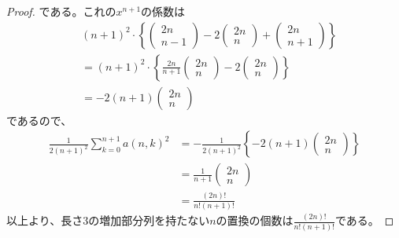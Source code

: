 \documentclass[a4paper,11pt]{jsarticle}
\theoremstyle{plain}
\theoremstyle{definition}
\renewcommand{\(}{\left(}
\renewcommand{\)}{\right)}
\renewcommand{\[}{\left[}
\renewcommand{\]}{\right]}
\renewcommand{\{}{\left\lbrace}
\renewcommand{\}}{\right\rbrace}
\newcommand{\pmat}[1]{\begin{pmatrix} #1 \end{pmatrix}}
\begin{document}
\begin{proof}
    である。これの$x^{n+1}$の係数は
    \begin{align*}
        & (n+1)^2 \cdot \{ \pmat{2n \\ n-1} -2 \pmat{2n \\ n} + \pmat{2n \\ n+1}\} \\
        &= (n+1)^2 \cdot \{ \frac{2n}{n+1}\pmat{2n \\ n} - 2\pmat{2n \\ n}\} \\
        &= - 2(n+1) \pmat{2n \\ n}
    \end{align*}
    であるので、
    \begin{align*}
        \frac{1}{2(n+1)^2} \sum_{k=0}^{n+1} a(n,k)^2 &= -\frac{1}{2(n+1)^2} \{- 2(n+1) \pmat{2n \\ n}\}  \\
        &= \frac{1}{n+1} \pmat{2n \\ n} \\
        &= \frac{(2n)!}{n!(n+1)!}
    \end{align*}
    以上より、長さ$3$の増加部分列を持たない$n$の置換の個数は$\displaystyle \frac{(2n)!}{n!(n+1)!}$である。
\end{proof}
\end{document}
